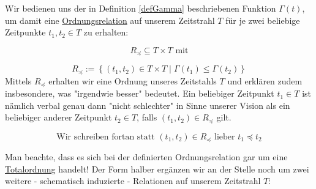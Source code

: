 \begin{Def}\label{defRelation}

Wir bedienen uns der in Definition \ref{defGamma} beschriebenen Funktion $\Gamma(t)$, um damit eine \href{https://de.wikipedia.org/wiki/Ordnungsrelation}{Ordnungsrelation} 
auf unserem Zeitstrahl $T$ für je zwei beliebige Zeitpunkte $t_1, t_2 \in T$ zu erhalten: 

\vspace{0.3cm}

\begin{equation*}
  R_{\preceq} \subseteq T \times T \textrm{ mit}
\end{equation*}

\begin{equation*}
  R_{\preceq}:= \left\{ (t_1, t_2) \in T \times T \mid \Gamma(t_1) \leq \Gamma(t_2) \right\}
\end{equation*}
\vspace{1cm}
Mittels $R_{\preceq}$ erhalten wir eine Ordnung unseres Zeitstahls $T$ und erklären zudem insbesondere, was "irgendwie besser" bedeutet. Ein beliebiger Zeitpunkt $t_1 \in T$ ist nämlich verbal genau dann "nicht schlechter" in Sinne unserer Vision als ein beliebiger anderer Zeitpunkt $t_2 \in T$, falls $(t_1, t_2) \in R_{\preceq}$ gilt.

\vspace{0.3cm}

\begin{equation*}
  \textrm{Wir schreiben fortan statt } (t_1, t_2) \in R_{\preceq} \textrm{ lieber } t_1 \preceq t_2 
\end{equation*}

\end{Def}

\vspace{1cm}

Man beachte, dass es sich bei der definierten Ordnungsrelation gar um eine \href{https://de.wikipedia.org/wiki/Ordnungsrelation#Totalordnung}{Totalordnung} handelt!
Der Form halber ergänzen wir an der Stelle noch um zwei weitere - schematisch induzierte - Relationen auf unserem Zeitstrahl $T$:

\vspace{0.3cm}

